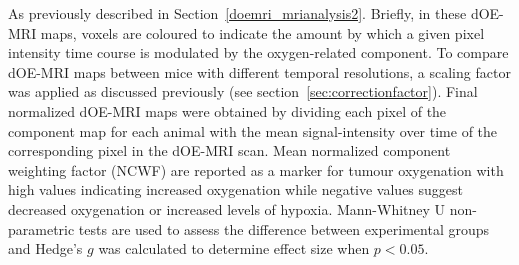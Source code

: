 As previously described in Section~\ref{doemri_mrianalysis2}.
Briefly, in these \ac{dOE-MRI} maps, voxels are coloured to indicate the amount by which a given pixel intensity time course is modulated by the oxygen-related component.
To compare \ac{dOE-MRI} maps between mice with different temporal resolutions, a scaling factor was applied as discussed previously (see section~\ref{sec:correctionfactor}).
Final normalized \ac{dOE-MRI} maps were obtained by dividing each pixel of the component map for each animal with the mean signal-intensity over time of the corresponding pixel in the \ac{dOE-MRI} scan. 
Mean normalized component weighting factor (\acs{NCWF}) are reported as a marker for tumour oxygenation with high values indicating increased oxygenation while negative values suggest decreased oxygenation or increased levels of hypoxia. 
Mann-Whitney U non-parametric tests are used to assess the difference between experimental groups and Hedge's $g$ was calculated to determine effect size when $p<0.05$.

